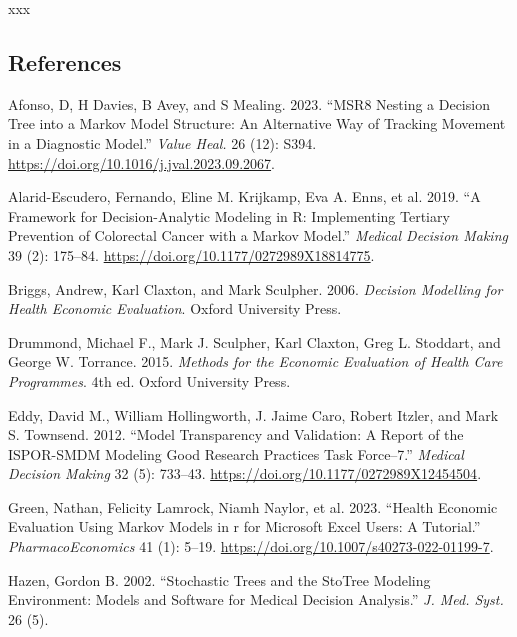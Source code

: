 \documentclass[
]{article}
\newlength{\cslhangindent}
\newenvironment{CSLReferences}[2] %
 {\begin{list}{}{%
  \setlength{\itemindent}{0pt}
  \setlength{\leftmargin}{0pt}
  \setlength{\parsep}{0pt}
  \ifodd #1
   \setlength{\leftmargin}{\cslhangindent}
   \setlength{\itemindent}{-1\cslhangindent}
  \fi
  \setlength{\itemsep}{#2\baselineskip}}}
 {\end{list}}
\begin{document}
xxx

\subsection*{References}\label{references}

\protect{}\label{refs}
\begin{CSLReferences}{1}{1}
Afonso, D, H Davies, B Avey, and S Mealing. 2023. {``{MSR8 Nesting a
Decision Tree into a Markov Model Structure: An Alternative Way of
Tracking Movement in a Diagnostic Model}.''} \emph{Value Heal.} 26 (12):
S394. \url{https://doi.org/10.1016/j.jval.2023.09.2067}.

Alarid-Escudero, Fernando, Eline M. Krijkamp, Eva A. Enns, et al. 2019.
{``A Framework for Decision-Analytic Modeling in {R}: Implementing
Tertiary Prevention of Colorectal Cancer with a {Markov} Model.''}
\emph{Medical Decision Making} 39 (2): 175--84.
\url{https://doi.org/10.1177/0272989X18814775}.

Briggs, Andrew, Karl Claxton, and Mark Sculpher. 2006. \emph{Decision
Modelling for Health Economic Evaluation}. Oxford University Press.

Drummond, Michael F., Mark J. Sculpher, Karl Claxton, Greg L. Stoddart,
and George W. Torrance. 2015. \emph{Methods for the Economic Evaluation
of Health Care Programmes}. 4th ed. Oxford University Press.

Eddy, David M., William Hollingworth, J. Jaime Caro, Robert Itzler, and
Mark S. Townsend. 2012. {``Model Transparency and Validation: A Report
of the {ISPOR-SMDM} Modeling Good Research Practices Task Force--7.''}
\emph{Medical Decision Making} 32 (5): 733--43.
\url{https://doi.org/10.1177/0272989X12454504}.

Green, Nathan, Felicity Lamrock, Niamh Naylor, et al. 2023. {``Health
Economic Evaluation Using Markov Models in r for Microsoft Excel Users:
A Tutorial.''} \emph{PharmacoEconomics} 41 (1): 5--19.
\url{https://doi.org/10.1007/s40273-022-01199-7}.

Hazen, Gordon B. 2002. {``{Stochastic Trees and the StoTree Modeling
Environment: Models and Software for Medical Decision Analysis}.''}
\emph{J. Med. Syst.} 26 (5).


\end{CSLReferences}
\end{document}
